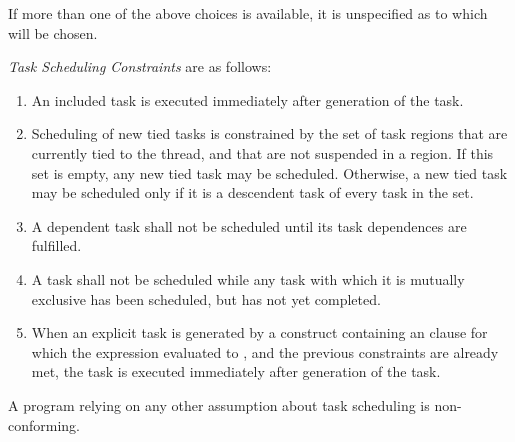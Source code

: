 If more than one of the above choices is available, it is unspecified as to which will be
chosen.

\emph{Task Scheduling Constraints} are as follows:

\begin{enumerate}
\item An included task is executed immediately after generation of the task.

\item Scheduling of new tied tasks is constrained by the set of task regions that are currently
tied to the thread, and that are not suspended in a  region. If this set is empty,
any new tied task may be scheduled. Otherwise, a new tied task may be scheduled only
if it is a descendent task of every task in the set.

\item A dependent task shall not be scheduled until its task dependences are fulfilled.

\item A task shall not be scheduled while any task with which it is
mutually exclusive has been scheduled, but has not yet completed.

\item When an explicit task is generated by a construct containing an  clause for which the
expression evaluated to , and the previous constraints are already met, the task is
executed immediately after generation of the task.
\end{enumerate}

A program relying on any other assumption about task scheduling is non-conforming.

